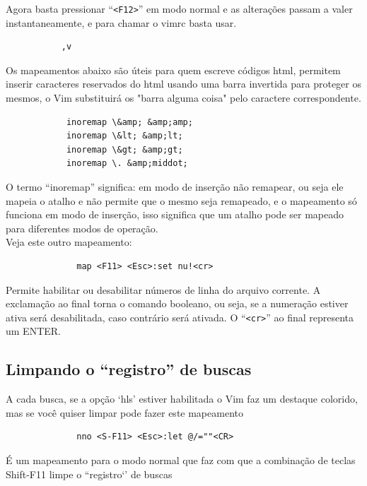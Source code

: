 \documentclass[10pt,a4paper,openany]{book}
\begin{document}
Agora basta pressionar ``\verb|<F12>|'' em modo normal e as alterações passam a valer
instantaneamente, e para chamar o vimrc basta usar.

\begin{verbatim}
		   ,v
\end{verbatim}



Os mapeamentos abaixo são úteis
para quem escreve códigos html, permitem inserir caracteres reservados do html
usando uma barra invertida para proteger os mesmos, o Vim substituirá os "barra
alguma coisa" pelo caractere correspondente.

\begin{verbatim}
			inoremap \&amp; &amp;amp;
			inoremap \&lt; &amp;lt;
			inoremap \&gt; &amp;gt;
			inoremap \. &amp;middot;
\end{verbatim}

O termo ``inoremap'' significa: em modo de inserção não remapear, ou seja
ele mapeia o atalho e não permite que o mesmo seja remapeado, e o
mapeamento só funciona em modo de inserção, isso significa que um atalho
pode ser mapeado para diferentes modos de operação. \\


Veja este outro mapeamento:

\begin{verbatim}
			  map <F11> <Esc>:set nu!<cr>
\end{verbatim}

Permite habilitar ou desabilitar números de linha do arquivo corrente.
A exclamação ao final torna o comando booleano, ou seja, se a
numeração estiver ativa será desabilitada, caso contrário será
ativada. O ``\verb|<cr>|'' ao final representa um ENTER.

\subsection{Limpando o ``registro'' de buscas}\label{Limpando o ``registro'' de buscas}

A cada busca, se a opção `hls' estiver habilitada o Vim faz um
destaque colorido, mas se você quiser limpar pode fazer este
mapeamento

\begin{verbatim}
			  nno <S-F11> <Esc>:let @/=""<CR>
\end{verbatim}

É um mapeamento para o modo normal que faz com que a combinação de
teclas Shift-F11 limpe o ``registro`' de buscas
\end{document}
